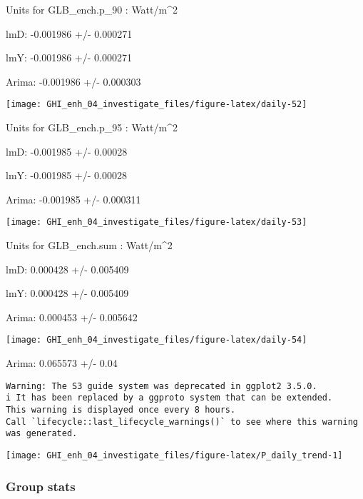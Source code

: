 \documentclass[
  10pt,
  a4paper,oneside]{article}
\begin{document}
Units for GLB\_ench.p\_90 : Watt/m\^{}2

lmD: -0.001986 +/- 0.000271

lmY: -0.001986 +/- 0.000271

Arima: -0.001986 +/- 0.000303

\begin{center}\texttt{[image: GHI\_enh\_04\_investigate\_files/figure-latex/daily-52]} \end{center}

Units for GLB\_ench.p\_95 : Watt/m\^{}2

lmD: -0.001985 +/- 0.00028

lmY: -0.001985 +/- 0.00028

Arima: -0.001985 +/- 0.000311

\begin{center}\texttt{[image: GHI\_enh\_04\_investigate\_files/figure-latex/daily-53]} \end{center}

Units for GLB\_ench.sum : Watt/m\^{}2

lmD: 0.000428 +/- 0.005409

lmY: 0.000428 +/- 0.005409

Arima: 0.000453 +/- 0.005642

\begin{center}\texttt{[image: GHI\_enh\_04\_investigate\_files/figure-latex/daily-54]} \end{center}

Arima: 0.065573 +/- 0.04

\begin{verbatim}
Warning: The S3 guide system was deprecated in ggplot2 3.5.0.
i It has been replaced by a ggproto system that can be extended.
This warning is displayed once every 8 hours.
Call `lifecycle::last_lifecycle_warnings()` to see where this warning was generated.
\end{verbatim}

\begin{center}\texttt{[image: GHI\_enh\_04\_investigate\_files/figure-latex/P\_daily\_trend-1]} \end{center}

\newpage
\FloatBarrier

\hypertarget{group-stats}{%
\subsubsection{Group stats}\label{group-stats}}
\end{document}
